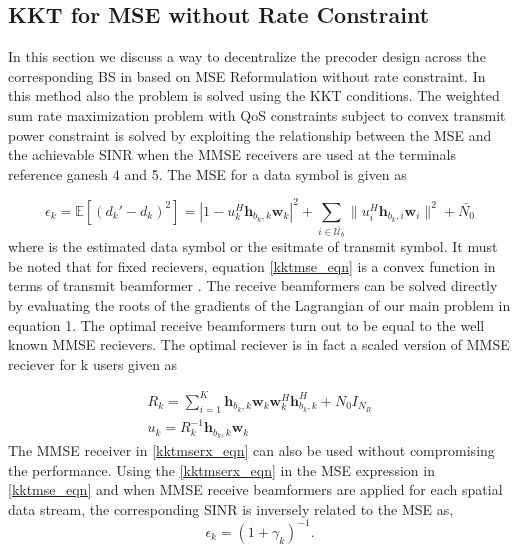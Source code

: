 \subsection{KKT for MSE without Rate Constraint}

In this section we discuss a way to decentralize the precoder design across the corresponding \ac{BS} in  based on MSE Reformulation without rate constraint. In this method also the problem is solved using the \ac{KKT} conditions. The weighted sum rate maximization problem with \ac{QoS} constraints subject to convex transmit power constraint  is solved by exploiting the relationship between the \ac{MSE} and the achievable \ac{SINR} when the \ac{MMSE} receivers are used at the terminals reference ganesh 4 and 5. The \ac{MSE}  for a data symbol  is given as

\begin{equation}
\epsilon_k = \mathbb{E} \left[ (d_k' - d_k)^2\right] = |1 - u_k^H \mathbf{h}_{{b_k},k} \mathbf{w}_k|^2 + \sum_{i \in \bar{\mathcal{U}_b}} \|u_i^H \mathbf{h}_{{b_k},i} \mathbf{w}_i\|^2 + \bar{N_0}
\label{kktmse_eqn}
\end{equation}
where  is the estimated data symbol or the esitmate of transmit symbol. It must be noted that for fixed recievers, equation \eqref{kktmse_eqn} is a convex function in terms of transmit beamformer . The receive beamformers  can be solved directly by evaluating the roots of the gradients of the Lagrangian of our main problem in equation 1. The optimal receive beamformers turn out to be equal to the well known \ac{MMSE} recievers. The optimal reciever is in fact a scaled version of \ac{MMSE} reciever for k users given as

\begin{eqnarray}
R_k = \sum_{i=1}^K \mathbf{h}_{{b_k},k} \mathbf{w}_k \mathbf{w}_k^H \mathbf{h}_{{b_k},k}^H + N_0 I_{N_R}  \nonumber \\
u_k = R_k^{-1} \mathbf{h}_{{b_k},k} \mathbf{w}_k 
\label{kktmserx_eqn}
\end{eqnarray}
The \ac{MMSE} receiver in \eqref{kktmserx_eqn} can also be used without compromising the performance. Using the \eqref{kktmserx_eqn} in the \ac{MSE} expression in \eqref{kktmse_eqn} and when \ac{MMSE} receive beamformers are applied for each spatial data stream, the corresponding \ac{SINR} is inversely related to the \ac{MSE} as,
\begin{equation}
\epsilon_k = \left(1 + \gamma_k\right)^{-1}.
\end{equation}

